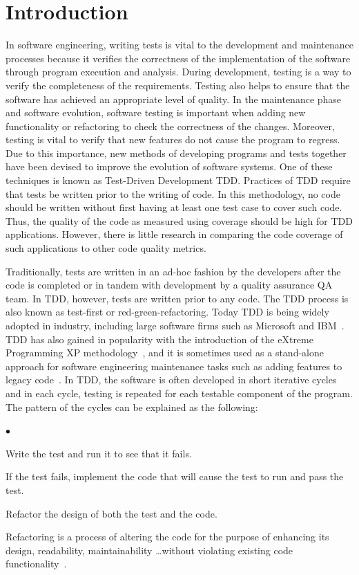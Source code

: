 \documentclass[conference]{IEEEtran}
\newcommand{\squishlist}{
 \begin{list}{$\bullet$}
  { \setlength{\itemsep}{0pt}
     \setlength{\parsep}{3pt}
     \setlength{\topsep}{3pt}
     \setlength{\partopsep}{0pt}
     \setlength{\leftmargin}{1.5em}
     \setlength{\labelwidth}{1em}
     \setlength{\labelsep}{0.5em} } }
\newcommand{\squishend}{
  \end{list}  }
\begin{document}
\section{Introduction}
In software engineering, writing tests is vital to the development and maintenance processes because it verifies the correctness of the implementation of the software through program execution and analysis. During development, testing is a way to verify the completeness of the requirements.  Testing also helps to ensure that the software has achieved an appropriate level of quality. In the maintenance phase and software evolution, software testing is important when adding new functionality or refactoring to check the correctness of the changes. Moreover, testing is vital to verify that new features do not cause the program to regress.  Due to this importance, new methods of developing programs and tests together have been devised to improve the evolution of software systems.  One of these techniques is known as Test-Driven Development TDD. Practices of TDD require that tests be written prior to the writing of code.  In this methodology, no code should be written without first having at least one test case to cover such code.  Thus, the quality of the code as measured using coverage should be high for TDD applications.  However, there is little research in comparing the code coverage of such applications to other code quality metrics. 

Traditionally, tests are written in an ad-hoc fashion by the developers after the code is completed or in tandem with development by a quality assurance QA team.  In TDD, however, tests are written prior to any code.  The TDD process is also known as test-first or red-green-refactoring. Today TDD is being widely adopted in industry, including large software firms such as Microsoft and IBM~\cite{nagappan2008realizing}.   TDD has also gained in popularity with the introduction of the eXtreme Programming XP methodology~\cite{beck2004extreme}, and it is sometimes used as a stand-alone approach for software engineering maintenance tasks such as adding features to legacy code~\cite{feathers2004working}. In TDD, the software is often developed in short iterative cycles and in each cycle, testing is repeated for each testable component of the program. The pattern of the cycles can be explained as the following:
\squishlist 
\item Write the test and run it to see that it fails.
\item If the test fails, implement the code that will cause the test to run and pass the test.
\item Refactor the design of both the test and the code. 
\squishend
Refactoring is a process of altering the code for the purpose of enhancing its design, readability, maintainability \ldots without violating existing code functionality~\cite{fowler1999refactoring}.
\end{document}
